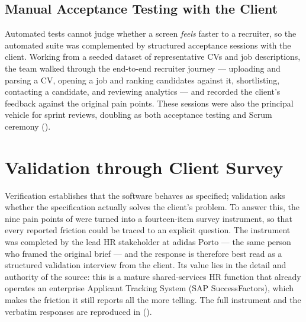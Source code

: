 \subsection{Manual Acceptance Testing with the Client}
\label{sec:val-manual}

Automated tests cannot judge whether a screen \textit{feels} faster to a
recruiter, so the automated suite was complemented by structured acceptance
sessions with the client. Working from a seeded dataset of representative
CVs and job descriptions, the team walked through the end-to-end recruiter
journey --- uploading and parsing a CV, opening a job and ranking candidates
against it, shortlisting, contacting a candidate, and reviewing analytics ---
and recorded the client's feedback against the original pain points. These
sessions were also the principal vehicle for sprint reviews, doubling as
both acceptance testing and Scrum ceremony ().


\section{Validation through Client Survey}
\label{sec:val-survey}

Verification establishes that the software behaves as specified; validation
asks whether the specification actually solves the client's problem. To
answer this, the nine pain points of 
were turned into a fourteen-item survey instrument, so that every reported
friction could be traced to an explicit question. The instrument was
completed by the lead HR stakeholder at adidas Porto --- the same person who
framed the original brief --- and the response is therefore best read as a
structured validation interview from the client. Its value lies in the detail
and authority of the source: this is a
mature shared-services HR function that already operates an enterprise
Applicant Tracking System (SAP SuccessFactors), which makes the friction it
still reports all the more telling. The full instrument and the verbatim
responses are reproduced in 
().

